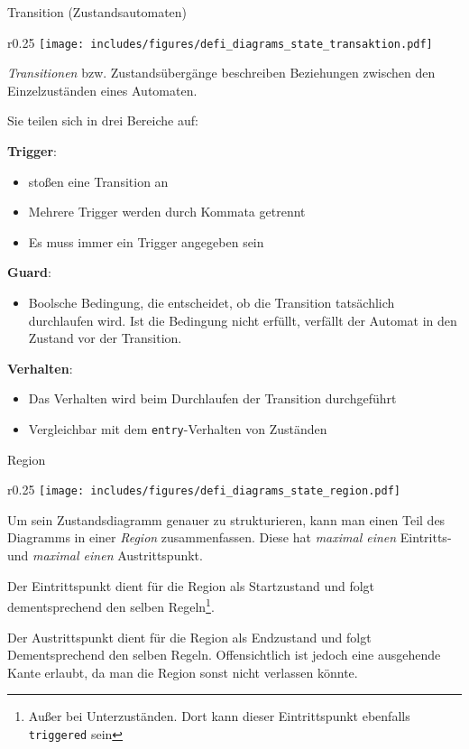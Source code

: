 \begin{diag}{Transition (Zustandsautomaten)}
    \begin{wrapfigure}{r}{0.25\textwidth}
        \centering
        \texttt{[image: includes/figures/defi\_diagrams\_state\_transaktion.pdf]}
    \end{wrapfigure}
    \emph{Transitionen} bzw. Zustandsübergänge beschreiben Beziehungen zwischen den Einzelzuständen eines Automaten.

    Sie teilen sich in drei Bereiche auf:

    \textbf{Trigger}:
    \begin{itemize}
        \item stoßen eine Transition an
        \item Mehrere Trigger werden durch Kommata getrennt
        \item Es muss immer ein Trigger angegeben sein
    \end{itemize}

    \textbf{Guard}:
    \begin{itemize}
        \item Boolsche Bedingung, die entscheidet, ob die Transition tatsächlich durchlaufen wird.
              Ist die Bedingung nicht erfüllt, verfällt der Automat in den Zustand vor der Transition.
    \end{itemize}

    \textbf{Verhalten}:
    \begin{itemize}
        \item Das Verhalten wird beim Durchlaufen der Transition durchgeführt
        \item Vergleichbar mit dem \texttt{entry}-Verhalten von Zuständen
    \end{itemize}
\end{diag}

\begin{diag}{Region}
    \begin{wrapfigure}{r}{0.25\textwidth}
        \centering
        \texttt{[image: includes/figures/defi\_diagrams\_state\_region.pdf]}
    \end{wrapfigure}
    Um sein Zustandsdiagramm genauer zu strukturieren, kann man einen Teil des Diagramms in einer \emph{Region} zusammenfassen.
    Diese hat \emph{maximal einen} Eintritts- und \emph{maximal einen} Austrittspunkt.

    Der Eintrittspunkt dient für die Region als Startzustand und folgt dementsprechend den selben Regeln\footnote{
        Außer bei Unterzuständen.
        Dort kann dieser Eintrittspunkt ebenfalls \texttt{triggered} sein
    }.

    Der Austrittspunkt dient für die Region als Endzustand und folgt Dementsprechend den selben Regeln.
    Offensichtlich ist jedoch eine ausgehende Kante erlaubt, da man die Region sonst nicht verlassen könnte.

    \vspace{1.5cm}
\end{diag}

